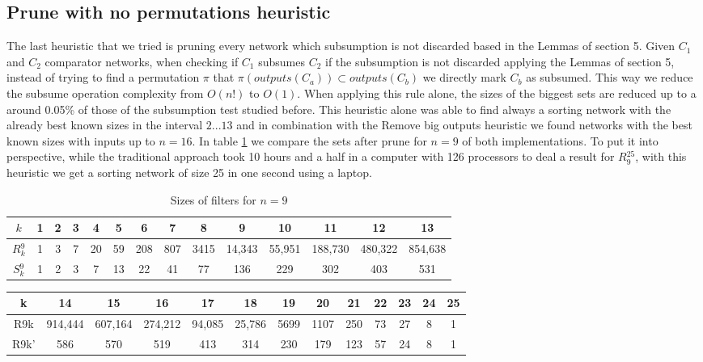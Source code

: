 \documentclass[../main.tex]{subfiles}
\begin{document}
	\subsection{Prune with no permutations heuristic}
	The last heuristic that we tried is pruning every network which subsumption is not discarded based in the Lemmas of section 5. Given $C_1$ and $C_2$ comparator networks, when checking if $C_1$ subsumes $C_2$ if the subsumption is not discarded applying the Lemmas of section 5, instead of trying to find a permutation $\pi$ that $\pi(outputs(C_a)) \subset outputs(C_b)$ we directly mark $C_b$ as subsumed. This way we reduce the subsume operation complexity from $O(n!)$ to $O(1)$. When applying this rule alone, the sizes of the biggest sets are reduced up to a around 0.05\% of those of the subsumption test studied before. This heuristic alone was able to find always a sorting network with the already best known sizes in the interval $2...13$ and in combination with the Remove big outputs heuristic we found networks with the best known sizes with inputs up to $n=16$. In table \ref{table:noPermutations} we compare the sets after prune for $n=9$ of both implementations. To put it into perspective, while the traditional approach took 10 hours and a half in a computer with 126 processors to deal a result for $R{_9^{25}}$, with this heuristic we get a sorting network of size 25 in one second using a laptop.  
	
	\begin{table}[H]
		\begin{tabular}{|c c c c c c c c c c c c c c|}
			\hline
			$k$ & 1 & 2 & 3 & 4 & 5 & 6 & 7 & 8 & 9 & 10 & 11 & 12 & 13  \\
			\hline\hline
			$R{^9_k}$& 1 & 3 & 7 & 20 & 59 & 208 & 807 & 3415 & 14,343 & 55,951 & 188,730 & 480,322 & 854,638 \\ 
			\hline
			$S{^9_k}$ & 1 & 2 & 3 & 7 & 13 & 22 & 41 & 77 & 136 & 229 & 302 & 403 & 531 \\
			\hline
		\end{tabular}
		\caption{Sizes of filters for $n=9$}
		\label{table:noPermutations}
	\end{table}
	\begin{table}[H]
		\begin{tabular}{|c c c c c c c c c c c c c|}
			\hline
			k & 14 & 15 & 16 & 17 & 18 & 19 & 20 & 21 & 22 & 23 & 24 & 25  \\
			\hline\hline
			R9k & 914,444 & 607,164 & 274,212 & 94,085 & 25,786 & 5699 & 1107 & 250 & 73 & 27 & 8 & 1 \\ 
			\hline
			R9k' & 586 & 570 & 519 & 413 & 314 & 230 & 179 & 123 & 57 & 24 & 8 & 1 \\
			\hline
		\end{tabular}
	\end{table}
\end{document}
